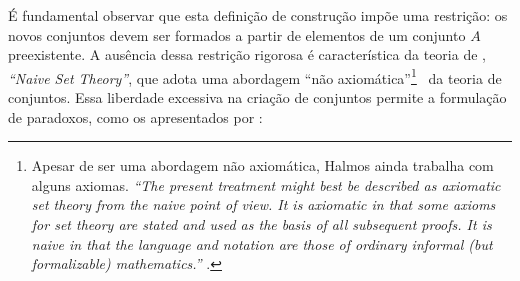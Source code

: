 É fundamental observar que esta definição de construção impõe uma restrição: os novos conjuntos devem ser formados a partir de elementos de um conjunto \(A\) preexistente. A ausência dessa restrição rigorosa é característica da teoria de \textcite{halmos2014}, \emph{``Naive Set Theory''}, que adota uma abordagem ``não axiomática''\footnote{Apesar de ser uma abordagem não axiomática, Halmos ainda trabalha com alguns axiomas. \emph{``The present treatment might best be described as axiomatic set theory from the naive point of view. It is axiomatic in that some axioms for set theory are stated and used as the basis of all subsequent proofs. It is naive in that the language and notation are those of ordinary informal (but formalizable) mathematics.''} \parencite[p.~v]{halmos2014}.} \ da teoria de conjuntos. Essa liberdade excessiva na criação de conjuntos permite a formulação de paradoxos, como os apresentados por \textcite[p.~5]{enderton1977}:

